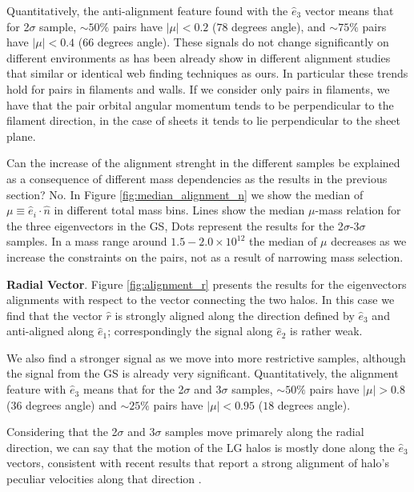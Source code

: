\documentclass{emulateapj}
\newcommand{\msun}{{\ifmmode{{\rm {M_{\odot}}}}\else{${\rm{M_{\odot}}}$}\fi}}
\begin{document}
Quantitatively, the anti-alignment feature found with the $\hat{e}_3$ 
vector means that for 2$\sigma$ sample, $\sim 50\%$ pairs have
$|\mu|<0.2$ ($78$ degrees angle), and $\sim 75\%$ pairs have $|\mu|<0.4$
($66$ degrees angle). 
These signals do not change significantly on
different environments as has been already show in different alignment
studies that similar \citep{Libeskind2013} or identical
\citep{ForeroRomero2014} web finding techniques as ours.
In particular  these trends hold for pairs in filaments and walls.
If we consider only pairs in filaments, we have that the pair orbital
angular momentum tends to be perpendicular to the filament direction,
in the case of sheets it tends to lie perpendicular to the sheet plane.

Can the increase of the alignment strenght in the different samples be
explained as a consequence of different mass dependencies as the
results in the previous section? No. 
In Figure \ref{fig:median_alignment_n} we show the median of
$\mu\equiv\hat{e}_i\cdot\hat{n}$ in different total mass bins.
Lines show the median $\mu$-mass relation for the three 
eigenvectors in the GS, Dots represent the results for the
2$\sigma$-3$\sigma$ samples. 
In a mass range around $1.5-2.0 \times 10^{12}$ \msun the median of
$\mu$ decreases as we increase the constraints on the pairs, not as a
result of narrowing mass selection. 


{\bf Radial Vector}.  Figure \ref{fig:alignment_r} presents the
results for the eigenvectors alignments with respect to the vector
connecting the two halos. 
In this case we find that the vector $\hat{r}$
is strongly aligned along the direction defined by
$\hat{e}_3$ and anti-aligned along $\hat{e}_1$; correspondingly the
signal along $\hat{e}_2$ is rather weak. 

We also find a stronger signal as we move into more restrictive
samples, although the signal from the GS is already very
significant. 
Quantitatively, the alignment feature with $\hat{e}_3$
means that for the 2$\sigma$ and 3$\sigma$ samples, $\sim 50\%$ pairs
have $|\mu|>0.8$ ($36$ degrees angle) and $\sim 25\%$ pairs have
$|\mu|<0.95$ ($18$ degrees angle).

Considering that the 2$\sigma$ and 3$\sigma$ samples move primarely
along the radial direction, we can say that the motion of the LG
halos is mostly done along the $\hat{e}_3$ vectors, consistent with
recent results that report a strong alignment of halo's peculiar
velocities along that direction \citep{ForeroRomero2014}.
\end{document}
